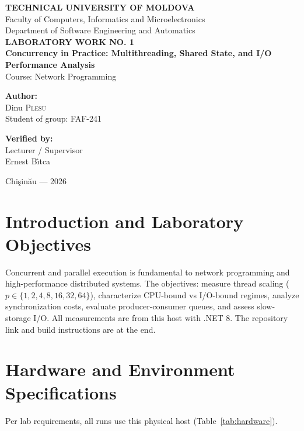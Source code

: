 \documentclass[12pt,a4paper]{article}
\newcommand{\studentgroup}{FAF-241}
\begin{document}
\begin{titlepage}
    \centering
    {\large \textbf{TECHNICAL UNIVERSITY OF MOLDOVA}}\\[0.2cm]
    {\large Faculty of Computers, Informatics and Microelectronics}\\[0.2cm]
    {\large Department of Software Engineering and Automatics}\\[0.8cm]


    {\Large \textbf{LABORATORY WORK NO. 1}}\\[0.4cm]
    {\LARGE \textbf{Concurrency in Practice: Multithreading, Shared State, and I/O Performance Analysis}}\\[0.4cm]
    {\large Course: Network Programming}\\[2.5cm]

    \begin{minipage}{0.45\textwidth}
        \flushleft
        \textbf{Author:}\\
        Dinu \textsc{Plesu}\\
        Student of group: \studentgroup
    \end{minipage}
    \hfill
    \begin{minipage}{0.45\textwidth}
        \flushright
        \textbf{Verified by:}\\
        Lecturer / Supervisor\\
        Ernest B\^{\i}tca
    \end{minipage}

    \vfill
    {\large Chi\c{s}in\u{a}u --- 2026}
\end{titlepage}

\newpage
\tableofcontents
\newpage

\section{Introduction and Laboratory Objectives}
Concurrent and parallel execution is fundamental to network programming and high-performance distributed systems. The objectives: measure thread scaling ($p\in\{1,2,4,8,16,32,64\}$), characterize CPU-bound vs I/O-bound regimes, analyze synchronization costs, evaluate producer-consumer queues, and assess slow-storage I/O. All measurements are from this host with .NET 8. The repository link and build instructions are at the end.

\section{Hardware and Environment Specifications}
\label{sec:hardware}
Per lab requirements, all runs use this physical host (Table~\ref{tab:hardware}).
\end{document}
